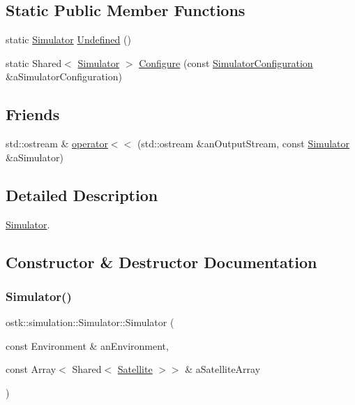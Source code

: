 \subsection*{Static Public Member Functions}
\begin{DoxyCompactItemize}
\item 
static \hyperlink{classostk_1_1simulation_1_1_simulator}{Simulator} \hyperlink{classostk_1_1simulation_1_1_simulator_a99876309ee0abbb7fb47b232bb28e6db}{Undefined} ()
\item 
static Shared$<$ \hyperlink{classostk_1_1simulation_1_1_simulator}{Simulator} $>$ \hyperlink{classostk_1_1simulation_1_1_simulator_ad95b067abdc0a5ddf348897161af46f1}{Configure} (const \hyperlink{structostk_1_1simulation_1_1_simulator_configuration}{Simulator\+Configuration} \&a\+Simulator\+Configuration)
\end{DoxyCompactItemize}
\subsection*{Friends}
\begin{DoxyCompactItemize}
\item 
std\+::ostream \& \hyperlink{classostk_1_1simulation_1_1_simulator_a69c38d700ebaa96e61bccca4bdbe717d}{operator$<$$<$} (std\+::ostream \&an\+Output\+Stream, const \hyperlink{classostk_1_1simulation_1_1_simulator}{Simulator} \&a\+Simulator)
\end{DoxyCompactItemize}


\subsection{Detailed Description}
\hyperlink{classostk_1_1simulation_1_1_simulator}{Simulator}. 

\subsection{Constructor \& Destructor Documentation}
\mbox{\label{classostk_1_1simulation_1_1_simulator_a6c69bdb82f84e62d0e006755d501e05a}} 
\subsubsection{\texorpdfstring{Simulator()}{Simulator()}}
{\footnotesize\ttfamily ostk\+::simulation\+::\+Simulator\+::\+Simulator (\begin{DoxyParamCaption}\item[{const Environment \&}]{an\+Environment,  }\item[{const Array$<$ Shared$<$ \hyperlink{classostk_1_1simulation_1_1_satellite}{Satellite} $>$$>$ \&}]{a\+Satellite\+Array }\end{DoxyParamCaption})}



